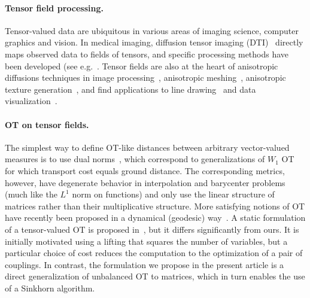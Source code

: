 \paragraph{Tensor field processing.}

Tensor-valued data are ubiquitous in various areas of imaging science, computer graphics and vision. In medical imaging, diffusion tensor imaging (DTI)~\cite{wandell2016clarifying} directly maps observed data to fields of tensors, and specific processing methods have been developed (see e.g.~\cite{Dryden2009,Deriche2006}. Tensor fields are also at the heart of anisotropic diffusions techniques in image processing~\cite{weickert1998anisotropic}, anisotropic meshing~\cite{alliez2003anisotropic,demaret2006image,peyre-iccv-09}, anisotropic texture generation~\cite{LagaImproving}, and find applications to line drawing~\cite{VaxmanCDPBHB16} and data visualization~\cite{HotzFHHJJ04}. 

\paragraph{OT on tensor fields.}

The simplest way to define OT-like distances between arbitrary vector-valued measures is to use dual norms~\cite{Ning2014metrics}, which correspond to generalizations of $W_1$ OT for which transport cost equals ground distance. The corresponding metrics, however, have degenerate behavior in interpolation and barycenter problems (much like the $L^1$ norm on functions) and only use the linear structure of matrices rather than their multiplicative structure.
%
More satisfying notions of OT have recently been proposed in a dynamical (geodesic) way~\cite{JiangSpectral,Carlen2014,Chen2016}. 
%
A static formulation of a tensor-valued OT is proposed in~\cite{ning2015matrix}, but it differs significantly from ours. It is initially motivated using a lifting that squares the number of variables, but a particular choice of cost reduces the computation to the optimization of a pair of couplings. In contrast, the formulation we propose in the present article is a direct generalization of unbalanced OT to matrices, which in turn enables the use of a Sinkhorn algorithm. 



